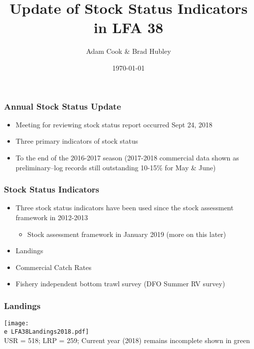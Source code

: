 \documentclass{beamer}
\title[LFA 38 American Lobster]{Update of Stock Status Indicators in LFA 38\\ }
\author{Adam Cook \& Brad Hubley} %
\institute[Population Ecology Division]
{Bedford Institute of Oceanography \\ %
\medskip
\textit{Adam.Cook@dfo-mpo.gc.ca} %
}
\date{\today} %
\newcommand{\e}{/SpinDr/backup/bio_data/bio.lobster/figures/}
\begin{document}
\begin{frame}
	\titlepage %

\end{frame}


%
\begin{frame}
\frametitle{Annual Stock Status Update}
%
\begin{itemize}
	\item Meeting for reviewing stock status report occurred Sept 24, 2018
	\item Three primary indicators of stock status 
	\item To the end of the 2016-2017 season (2017-2018 commercial data shown as preliminary--log records still outstanding 10-15\% for May \& June)
\end{itemize}

\end{frame}

\begin{frame}

	\frametitle{Stock Status Indicators}

	\begin{itemize}
		\item Three stock status indicators have been used since the stock assessment framework in 2012-2013
		\begin{itemize}
			\item Stock assessment framework in January 2019 (more on this later)
		\end{itemize}
		\item Landings
		\item Commercial Catch Rates
		\item Fishery independent bottom trawl survey (DFO Summer RV survey)
	\end{itemize}


\end{frame}


\begin{frame}
\frametitle{Landings}
%
	\centering
	  \texttt{[image: \\e LFA38Landings2018.pdf]}\\[-1ex]
	{\tiny{USR = 518; LRP = 259; Current year (2018) remains incomplete shown in green}}


\end{frame}
\end{document}

